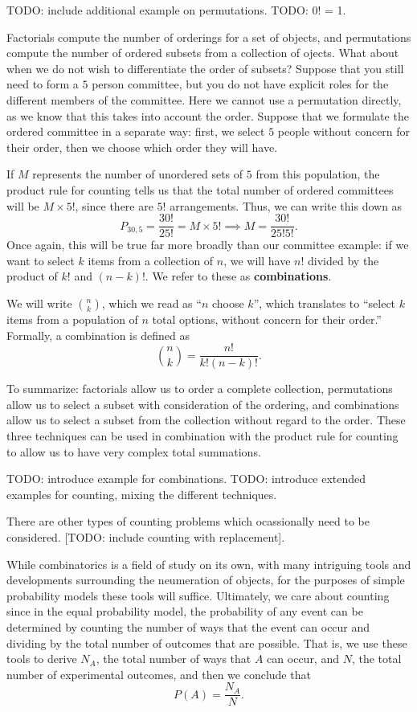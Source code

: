 \documentclass[
  letterpaper,
  DIV=11,
  numbers=noendperiod]{scrreprt}
\begin{document}
TODO: include additional example on permutations. TODO: 0! = 1.

Factorials compute the number of orderings for a set of objects, and
permutations compute the number of ordered subsets from a collection of
ojects. What about when we do not wish to differentiate the order of
subsets? Suppose that you still need to form a \(5\) person committee,
but you do not have explicit roles for the different members of the
committee. Here we cannot use a permutation directly, as we know that
this takes into account the order. Suppose that we formulate the ordered
committee in a separate way: first, we select \(5\) people without
concern for their order, then we choose which order they will have.

If \(M\) represents the number of unordered sets of \(5\) from this
population, the product rule for counting tells us that the total number
of ordered committees will be \(M\times 5!\), since there are \(5!\)
arrangements. Thus, we can write this down as
\[P_{30,5} = \frac{30!}{25!} = M\times 5! \implies M = \frac{30!}{25!5!}.\]
Once again, this will be true far more broadly than our committee
example: if we want to select \(k\) items from a collection of \(n\), we
will have \(n!\) divided by the product of \(k!\) and \((n-k)!\). We
refer to these as \textbf{combinations}.

We will write \(\binom{n}{k}\), which we read as ``\(n\) choose \(k\)'',
which translates to ``select \(k\) items from a population of \(n\)
total options, without concern for their order.'' Formally, a
combination is defined as \[\binom{n}{k} = \frac{n!}{k!(n-k)!}.\]

To summarize: factorials allow us to order a complete collection,
permutations allow us to select a subset with consideration of the
ordering, and combinations allow us to select a subset from the
collection without regard to the order. These three techniques can be
used in combination with the product rule for counting to allow us to
have very complex total summations.

TODO: introduce example for combinations. TODO: introduce extended
examples for counting, mixing the different techniques.

There are other types of counting problems which ocassionally need to be
considered. {[}TODO: include counting with replacement{]}.

While combinatorics is a field of study on its own, with many intriguing
tools and developments surrounding the neumeration of objects, for the
purposes of simple probability models these tools will suffice.
Ultimately, we care about counting since in the equal probability model,
the probability of any event can be determined by counting the number of
ways that the event can occur and dividing by the total number of
outcomes that are possible. That is, we use these tools to derive
\(N_A\), the total number of ways that \(A\) can occur, and \(N\), the
total number of experimental outcomes, and then we conclude that
\[P(A) = \frac{N_A}{N}.\]
\end{document}
